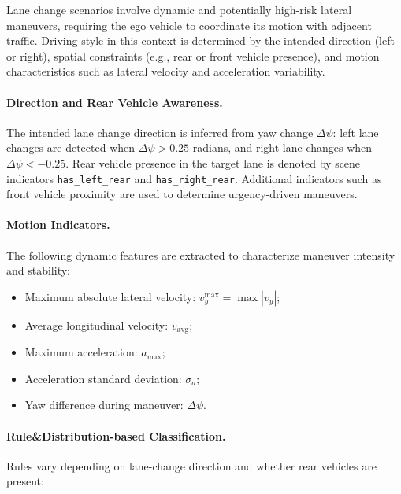 \documentclass{article}
\begin{document}
Lane change scenarios involve dynamic and potentially high-risk lateral maneuvers, requiring the ego vehicle to coordinate its motion with adjacent traffic. Driving style in this context is determined by the intended direction (left or right), spatial constraints (e.g., rear or front vehicle presence), and motion characteristics such as lateral velocity and acceleration variability.

\paragraph{Direction and Rear Vehicle Awareness.}
The intended lane change direction is inferred from yaw change $\Delta \psi$: left lane changes are detected when $\Delta \psi > 0.25$ radians, and right lane changes when $\Delta \psi < -0.25$. Rear vehicle presence in the target lane is denoted by scene indicators \texttt{has\_left\_rear} and \texttt{has\_right\_rear}. Additional indicators such as front vehicle proximity are used to determine urgency-driven maneuvers.

\paragraph{Motion Indicators.}
The following dynamic features are extracted to characterize maneuver intensity and stability:
\begin{itemize}[leftmargin=1em, topsep=0pt, itemsep=0.3em]
    \item Maximum absolute lateral velocity: $v_y^{\max} = \max |v_y|$;
    \item Average longitudinal velocity: $v_{\text{avg}}$;
    \item Maximum acceleration: $a_{\max}$;
    \item Acceleration standard deviation: $\sigma_a$;
    \item Yaw difference during maneuver: $\Delta \psi$.
\end{itemize}

\paragraph{Rule\&Distribution-based Classification.}
Rules vary depending on lane-change direction and whether rear vehicles are present:
\end{document}
